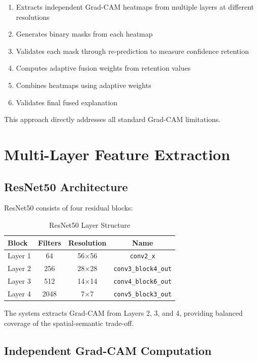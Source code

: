 \documentclass[12pt,a4paper,oneside]{book}
\begin{document}
\begin{enumerate}
  \item Extracts independent Grad-CAM heatmaps from multiple layers at different resolutions
  \item Generates binary masks from each heatmap
  \item Validates each mask through re-prediction to measure confidence retention
  \item Computes adaptive fusion weights from retention values
  \item Combines heatmaps using adaptive weights
  \item Validates final fused explanation
\end{enumerate}

This approach directly addresses all standard Grad-CAM limitations.

\section{Multi-Layer Feature Extraction}

\subsection{ResNet50 Architecture}

ResNet50 consists of four residual blocks:

\begin{table}[H]
\centering
\begin{tabular}{lccc}
\toprule
\textbf{Block} & \textbf{Filters} & \textbf{Resolution} & \textbf{Name} \\
\midrule
Layer 1 & 64 & 56×56 & \texttt{conv2\_x} \\
Layer 2 & 256 & 28×28 & \texttt{conv3\_block4\_out} \\
Layer 3 & 512 & 14×14 & \texttt{conv4\_block6\_out} \\
Layer 4 & 2048 & 7×7 & \texttt{conv5\_block3\_out} \\
\bottomrule
\end{tabular}
\caption{ResNet50 Layer Structure}
\label{tab:resnet50}
\end{table}

The system extracts Grad-CAM from Layers 2, 3, and 4, providing balanced coverage of the spatial-semantic trade-off.

\subsection{Independent Grad-CAM Computation}
\end{document}
